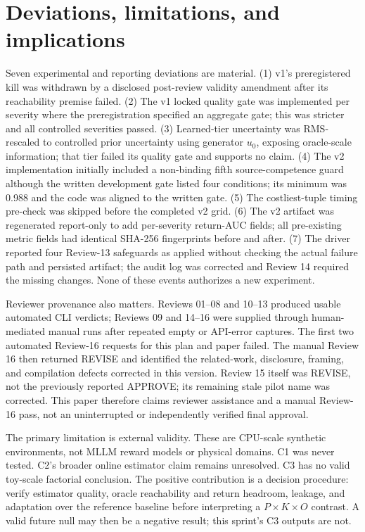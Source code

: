 \documentclass{article}
\begin{document}
\section{Deviations, limitations, and implications}
Seven experimental and reporting deviations are material. (1) v1's preregistered kill was withdrawn by a disclosed post-review validity amendment after its reachability premise failed. (2) The v1 locked quality gate was implemented per severity where the preregistration specified an aggregate gate; this was stricter and all controlled severities passed. (3) Learned-tier uncertainty was RMS-rescaled to controlled prior uncertainty using generator $u_0$, exposing oracle-scale information; that tier failed its quality gate and supports no claim. (4) The v2 implementation initially included a non-binding fifth source-competence guard although the written development gate listed four conditions; its minimum was 0.988 and the code was aligned to the written gate. (5) The costliest-tuple timing pre-check was skipped before the completed v2 grid. (6) The v2 artifact was regenerated report-only to add per-severity return-AUC fields; all pre-existing metric fields had identical SHA-256 fingerprints before and after. (7) The driver reported four Review-13 safeguards as applied without checking the actual failure path and persisted artifact; the audit log was corrected and Review 14 required the missing changes. None of these events authorizes a new experiment.

Reviewer provenance also matters. Reviews 01--08 and 10--13 produced usable automated CLI verdicts; Reviews 09 and 14--16 were supplied through human-mediated manual runs after repeated empty or API-error captures. The first two automated Review-16 requests for this plan and paper failed. The manual Review 16 then returned REVISE and identified the related-work, disclosure, framing, and compilation defects corrected in this version. Review 15 itself was REVISE, not the previously reported APPROVE; its remaining stale pilot name was corrected. This paper therefore claims reviewer assistance and a manual Review-16 pass, not an uninterrupted or independently verified final approval.

The primary limitation is external validity. These are CPU-scale synthetic environments, not MLLM reward models or physical domains. C1 was never tested. C2's broader online estimator claim remains unresolved. C3 has no valid toy-scale factorial conclusion. The positive contribution is a decision procedure: verify estimator quality, oracle reachability and return headroom, leakage, and adaptation over the reference baseline before interpreting a $P\times K\times O$ contrast. A valid future null may then be a negative result; this sprint's C3 outputs are not.
\end{document}
